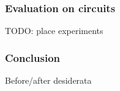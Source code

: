 \documentclass[./presentation.tex]{subfiles}
\begin{document}
\begin{frame}[label=working]
  \frametitle{Evaluation on circuits}
  TODO: place experiments
\end{frame}

\begin{frame}[label=working]
  \frametitle{Conclusion}
  Before/after desiderata
\end{frame}
\end{document}
